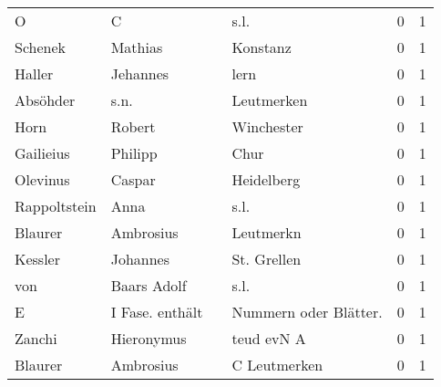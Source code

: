 \documentclass[10pt,a4paper,landscape]{article}
\begin{document}
\begin{longtable}{llllrr}
                        O &                                  C &             &                                        s.l. &          0 &         1 \\
                  Schenek &                            Mathias &             &                                    Konstanz &          0 &         1 \\
                   Haller &                           Jehannes &             &                                        lern &          0 &         1 \\
                 Absöhder &                               s.n. &             &                                  Leutmerken &          0 &         1 \\
                     Horn &                             Robert &             &                                  Winchester &          0 &         1 \\
                Gailieius &                            Philipp &             &                                        Chur &          0 &         1 \\
                 Olevinus &                             Caspar &             &                                  Heidelberg &          0 &         1 \\
             Rappoltstein &                               Anna &             &                                        s.l. &          0 &         1 \\
                  Blaurer &                          Ambrosius &             &                                   Leutmerkn &          0 &         1 \\
                  Kessler &                           Johannes &             &                                 St. Grellen &          0 &         1 \\
                      von &                        Baars Adolf &             &                                        s.l. &          0 &         1 \\
                        E &                    I Fase. enthält &             &                      Nummern oder Blätter.  &          0 &         1 \\
                   Zanchi &                         Hieronymus &             &                                  teud evN A &          0 &         1 \\
                  Blaurer &                          Ambrosius &             &                                C Leutmerken &          0 &         1 \\

\end{longtable}
\end{document}
